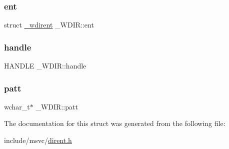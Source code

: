 \mbox{\label{struct___w_d_i_r_a84ae1457352005f813ed4b3dc1994b62}} 
\subsubsection{\texorpdfstring{ent}{ent}}
{\footnotesize\ttfamily struct \mbox{\hyperlink{struct__wdirent}{\+\_\+wdirent}} \+\_\+\+W\+D\+I\+R\+::ent}

\mbox{\label{struct___w_d_i_r_a694510e166fd3e797b3e15b9e4b3810a}} 
\subsubsection{\texorpdfstring{handle}{handle}}
{\footnotesize\ttfamily H\+A\+N\+D\+LE \+\_\+\+W\+D\+I\+R\+::handle}

\mbox{\label{struct___w_d_i_r_a700ff3a1096fb36452c571b0f55b4e60}} 
\subsubsection{\texorpdfstring{patt}{patt}}
{\footnotesize\ttfamily wchar\+\_\+t$\ast$ \+\_\+\+W\+D\+I\+R\+::patt}



The documentation for this struct was generated from the following file\+:\begin{DoxyCompactItemize}
\item 
include/msvc/\mbox{\hyperlink{dirent_8h}{dirent.\+h}}\end{DoxyCompactItemize}
